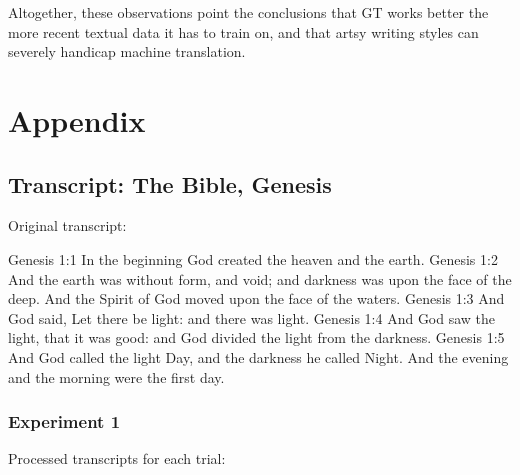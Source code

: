 \documentclass{article}
\newcommand{\forcenewpage}{\clearpage \newpage}
\begin{document}
Altogether, these observations point the conclusions that GT works better the more recent textual data it has to train on, and that artsy writing styles can severely handicap machine translation.



\forcenewpage
\section{Appendix}\subsection{Transcript: The Bible, Genesis}

Original transcript:

\begin{displayquote}
Genesis 1:1  In the beginning God created the heaven and the earth.
Genesis 1:2 And the earth was without form, and void; and darkness was upon the face of the deep. And the Spirit of God moved upon the face of the waters.
Genesis 1:3 And God said, Let there be light: and there was light.
Genesis 1:4 And God saw the light, that it was good: and God divided the light from the darkness.
Genesis 1:5 And God called the light Day, and the darkness he called Night. And the evening and the morning were the first day.
\end{displayquote}\subsubsection{Experiment 1}

Processed transcripts for each trial:
\end{document}

